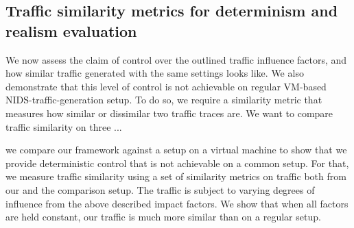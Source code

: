 \documentclass{article}
\begin{document}
\subsection{Traffic similarity metrics for determinism and realism evaluation}

We now assess the claim of control over the outlined traffic influence factors, and how similar traffic generated with the same settings looks like. We also demonstrate that this level of control is not achievable on regular VM-based NIDS-traffic-generation setup.
To do so, we require a similarity metric that measures how similar or dissimilar two traffic traces are. We want to compare traffic similarity on three ...

we compare our framework against a setup on a virtual machine to show that we provide deterministic control that is not achievable on a common setup. For that, we measure traffic similarity using a set of similarity metrics on traffic both from our and the comparison setup. The traffic is subject to varying degrees of influence from the above described impact factors. We show that when all factors are held constant, our traffic is much more similar than on a regular setup.


\end{document}
